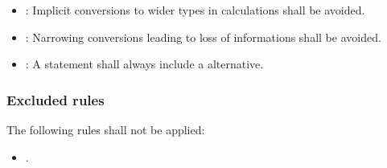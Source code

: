 \begin{itemize}
\item {}:
Implicit conversions to wider types in calculations shall be avoided.

\item {}:
Narrowing conversions leading to loss of informations shall be avoided.

\item {}:
A  statement shall always include a  alternative.

\end{itemize}

\subsubsection{Excluded rules}

The following rules shall not be applied:

\begin{itemize}

\item {}.

\end{itemize}
